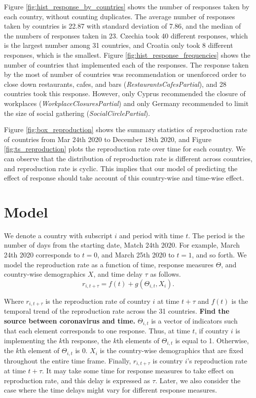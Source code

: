\documentclass[11pt]{article}
\begin{document}
Figure \ref{fig:hist_response_by_countries} shows the number of responses taken by each country, without counting duplicates. The average number of responses taken by countries is 22.87 with standard deviation of 7.86, and the median of the numbers of responses taken in 23. Czechia took 40 different responses, which is the largest number among 31 countries, and Croatia only took 8 different responses, which is the smallest. Figure \ref{fig:hist_response_frequencies} shows the number of countries that implemented each of the responses. The response taken by the most of number of countries was recommendation or unenforced order to close down restaurants, cafes, and bars (\textit{RestaurantsCafesPartial}), and 28 countries took this response. However, only Cyprus recommended the closure of workplaces (\textit{WorkplaceClosuresPartial}) and only Germany recommended to limit the size of social gathering (\textit{SocialCirclePartial}).

Figure \ref{fig:box_reproduction} shows the summary statistics of reproduction rate of countries from Mar 24th 2020 to December 18th 2020, and Figure \ref{fig:ts_reproduction} plots the reproduction rate over time for each country. We can observe that the distribution of reproduction rate is different across countries, and reproduction rate is cyclic. This implies that our model of predicting the effect of response should take account of this country-wise and time-wise effect.

\section{Model}
We denote a country with subscript $i$ and period with time $t$. The period is the number of days from the starting date, Match 24th 2020. For example, March 24th 2020 corresponds to $t=0$, and March 25th 2020 to $t=1$, and so forth. We model the reproduction rate as a function of time, response measures $\Theta$, and country-wise demographics $X$, and time delay $\tau$ as follows.
\begin{equation}
     r_{i,t+\tau} = f(t) + g(\Theta_{i,t},X_i).\label{eq:main_model}\tag{MODEL}
\end{equation}

Where $r_{i,t+\tau}$ is the reproduction rate of country $i$ at time $t+\tau$ and $f(t)$ is the temporal trend of the reproduction rate across the 31 countries. \textbf{Find the source between coronavirus and time.} $\Theta_{i,t}$ is a vector of indicators such that each element corresponds to one response. Thus, at time $t$, if country $i$ is implementing the $k$th response, the $k$th elements of $\Theta_{i,t}$ is equal to 1. Otherwise, the $k$th element of $\Theta_{i,t}$ is 0. $X_{i}$ is the country-wise demographics that are fixed throughout the entire time frame. Finally, $r_{i,t+\tau}$ is country $i$'s reproduction rate at time $t+\tau$. It may take some time for response measures to take effect on reproduction rate, and this delay is expressed as $\tau$. Later, we also consider the case where the time delays might vary for different response measures.  
\end{document}
